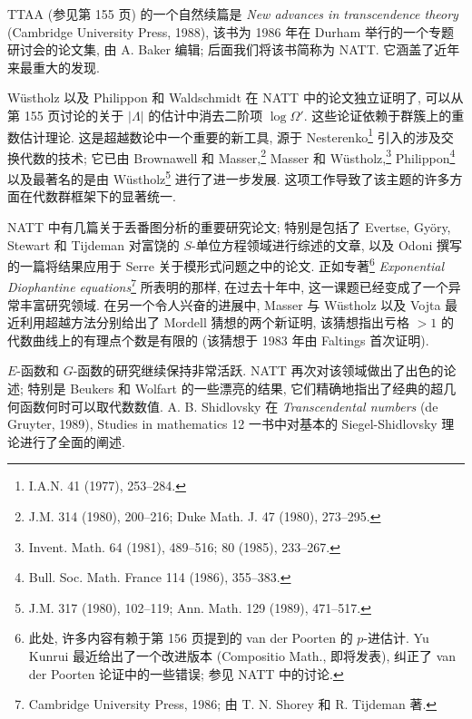 TTAA (参见第 155 页) 的一个自然续篇是 \textit{New advances in transcendence theory} (Cambridge University Press, 1988), 该书为 1986 年在 Durham 举行的一个专题研讨会的论文集, 由 A. Baker 编辑; 后面我们将该书简称为 NATT. 它涵盖了近年来最重大的发现.

W{\"u}stholz 以及 Philippon 和 Waldschmidt 在 NATT 中的论文独立证明了, 可以从第 155 页讨论的关于 \(|\Lambda|\) 的估计中消去二阶项 \(\log \Omega'\). 这些论证依赖于群簇上的重数估计理论. 这是超越数论中一个重要的新工具, 源于 Nesterenko\footnote{I.A.N. 41 (1977), 253--284.} 引入的涉及交换代数的技术; 它已由 Brownawell 和 Masser,\footnote{J.M. 314 (1980), 200--216; Duke Math. J. 47 (1980), 273--295.} Masser 和 W{\"u}stholz,\footnote{Invent. Math. 64 (1981), 489--516; 80 (1985), 233--267.} Philippon\footnote{Bull. Soc. Math. France 114 (1986), 355--383.} 以及最著名的是由 W{\"u}stholz\footnote{J.M. 317 (1980), 102--119; Ann. Math. 129 (1989), 471--517.} 进行了进一步发展. 这项工作导致了该主题的许多方面在代数群框架下的显著统一.

NATT 中有几篇关于丢番图分析的重要研究论文; 特别是包括了 Evertse, Gy{\"o}ry, Stewart 和 Tijdeman 对富饶的 \(S\)-单位方程领域进行综述的文章, 以及 Odoni 撰写的一篇将结果应用于 Serre 关于模形式问题之中的论文. 正如专著\footnote{此处, 许多内容有赖于第 156 页提到的 van der Poorten 的 \(p\)-进估计. Yu Kunrui 最近给出了一个改进版本 (Compositio Math., 即将发表), 纠正了 van der Poorten 论证中的一些错误; 参见 NATT 中的讨论.} \textit{Exponential Diophantine equations}\footnote{Cambridge University Press, 1986; 由 T. N. Shorey 和 R. Tijdeman 著.} 所表明的那样, 在过去十年中, 这一课题已经变成了一个异常丰富研究领域. 在另一个令人兴奋的进展中, Masser 与 W{\"u}stholz 以及 Vojta 最近利用超越方法分别给出了 Mordell 猜想的两个新证明, 该猜想指出亏格 \({}>1\) 的代数曲线上的有理点个数是有限的 (该猜想于 1983 年由 Faltings 首次证明).

\(E\)-函数和 \(G\)-函数的研究继续保持非常活跃. NATT 再次对该领域做出了出色的论述; 特别是 Beukers 和 Wolfart 的一些漂亮的结果, 它们精确地指出了经典的超几何函数何时可以取代数数值. A. B. Shidlovsky 在 \textit{Transcendental numbers} (de Gruyter, 1989), Studies in mathematics 12 一书中对基本的 Siegel-Shidlovsky 理论进行了全面的阐述.

